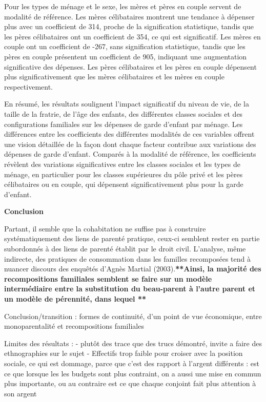 \documentclass[
  12pt,
]{book}
\begin{document}
Pour les types de ménage et le sexe, les mères et pères en couple
servent de modalité de référence. Les mères célibataires montrent une
tendance à dépenser plus avec un coefficient de 314, proche de la
signification statistique, tandis que les pères célibataires ont un
coefficient de 354, ce qui est significatif. Les mères en couple ont un
coefficient de -267, sans signification statistique, tandis que les
pères en couple présentent un coefficient de 905, indiquant une
augmentation significative des dépenses. Les pères célibataires et les
pères en couple dépensent plus significativement que les mères
célibataires et les mères en couple respectivement.

En résumé, les résultats soulignent l'impact significatif du niveau de
vie, de la taille de la fratrie, de l'âge des enfants, des différentes
classes sociales et des configurations familiales sur les dépenses de
garde d'enfant par ménage. Les différences entre les coefficients des
différentes modalités de ces variables offrent une vision détaillée de
la façon dont chaque facteur contribue aux variations des dépenses de
garde d'enfant. Comparés à la modalité de référence, les coefficients
révèlent des variations significatives entre les classes sociales et les
types de ménage, en particulier pour les classes supérieures du pôle
privé et les pères célibataires ou en couple, qui dépensent
significativement plus pour la garde d'enfant.

\textbf{Conclusion}

Partant, il semble que la cohabitation ne suffise pas à construire
systématiquement des liens de parenté pratique, ceux-ci semblent rester
en partie subordonnés à des liens de parenté établit par le droit civil.
L'analyse, même indirecte, des pratiques de consommation dans les
familles recomposées tend à nuancer discours des enquêtés d'Agnès
Martial (2003).\textbf{**Ainsi, la majorité des recompositions
familiales semblent se faire sur un modèle intermédiaire entre la
substitution du beau-parent à l'autre parent et un modèle de pérennité,
dans lequel **}

Conclusion/transition : formes de continuité, d'un point de vue
économique, entre monoparentalité et recompositions familiales

Limites des résultats : - plutôt des trace que des trucs démontré,
invite a faire des ethnographies sur le sujet - Effectifs trop faible
pour croiser avec la position sociale, ce qui est dommage, parce que
c'est des rapport à l'argent différents : est ce que lorsque les les
budgets sont plus contraint, on a aussi une mise en commun plus
importante, ou au contraire est ce que chaque conjoint fait plus
attention à son argent
\end{document}
